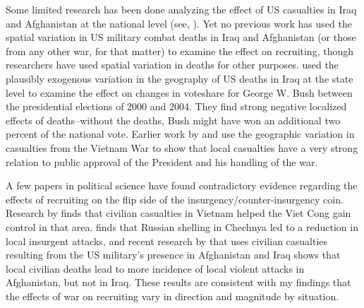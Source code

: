 \documentclass[12pt] {article}
\begin{document}
Some limited research has been done analyzing the effect of US casualties
in Iraq and Afghanistan at the national level (see\cite{BigRandDocument}, \cite{Simon-Warner-DEATHS!}).
Yet no previous work has used the spatial variation in US military combat deaths in Iraq and Afghanistan (or those from any other war, for that matter) to examine the effect
on recruiting, though researchers have used spatial variation
in deaths for other purposes. \cite{Ted-Miguel-Bush-Deaths}
used the plausibly exogenous variation in the geography of US deaths in Iraq at the state level to examine the effect on changes in voteshare for George W. Bush between
the presidential elections of 2000 and 2004. They find strong negative
localized effects of deaths--without the deaths, Bush might have won
an additional two percent of the national vote. Earlier work by \cite{SSGartner-WarCasualtiesPublicOpinion}
and \cite{SSGartnerAllPoliticsLocal} use the geographic variation
in casualties from the Vietnam War to show that local casualties have
a very strong relation to public approval of the President and his
handling of the war. %

A few papers in political science have found contradictory evidence regarding the effects of recruiting on the flip side of the insurgency/counter-insurgency coin. Research by \cite {Kocher-Vietnam} finds that civilian casualties in Vietnam helped the Viet Cong gain control in that area. \cite {Lyall} finds that Russian shelling in Chechnya led to a reduction in local insurgent attacks, and recent research by \cite{AfghanIraqCasualties} that uses civilian casualties resulting from the US military's presence in Afghanistan and Iraq shows that local civilian deaths lead to more incidence
of local violent attacks in Afghanistan, but not in Iraq. These results are consistent with my findings that the effects of war on recruiting vary in direction and magnitude by situation. 


\end{document}
